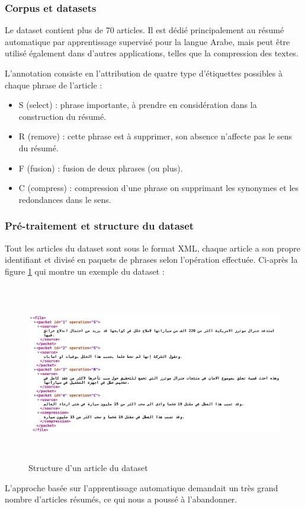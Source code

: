         \subsubsection{Corpus et datasets}
        Le dataset contient plus de 70 articles. Il est dédié principalement au résumé automatique par apprentissage supervisé pour la langue Arabe, mais peut être utilisé également dans d'autres applications, telles que la compression des textes.

        L'annotation consiste en l'attribution de quatre type d’étiquettes possibles à chaque phrase de l'article :
            \begin{itemize}
                \item S (select) : phrase importante, à prendre en considération dans la construction du résumé.
                \item R (remove) : cette phrase est à supprimer, son absence n'affecte pas le sens du résumé.
                \item F (fusion) : fusion de deux phrases (ou plus).
                \item C (compress) : compression d'une phrase on supprimant les synonymes et les redondances dans le sens.\\
            \end{itemize}

        \subsubsection{Pré-traitement et structure du dataset}
        Tout les articles du dataset sont sous le format XML, chaque article a son propre identifiant et divisé en paquets de phrases selon l'opération effectuée. Ci-après la figure \ref{xml-structure} qui montre un exemple du dataset : 
        \begin{figure}[H]
            \centering
            \includegraphics[height=220pt,width=430pt]{img/chapter4/xml.png}
            \caption{Structure d'un article du dataset}
            \label{xml-structure}
        \end{figure}
        L'approche basée sur l'apprentissage automatique demandait un très grand nombre d'articles résumés, ce qui nous a poussé à l'abandonner.

